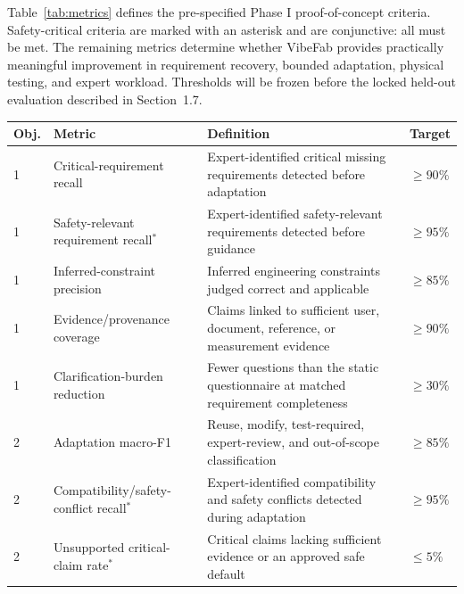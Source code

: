 \documentclass[11pt,letterpaper]{article}
\begin{document}
Table~\ref{tab:metrics} defines the pre-specified Phase I proof-of-concept criteria. Safety-critical criteria are marked with an asterisk and are conjunctive: all must be met. The remaining metrics determine whether VibeFab provides practically meaningful improvement in requirement recovery, bounded adaptation, physical testing, and expert workload. Thresholds will be frozen before the locked held-out evaluation described in Section~1.7.

\vspace{-3pt}
\begin{table}[H]
\centering
\scriptsize
\setlength{\tabcolsep}{3.5pt}
\begin{tabularx}{\textwidth}{
P{0.035\textwidth}
P{0.255\textwidth}
Y
P{0.05\textwidth}}
\toprule
\textbf{Obj.} &
\textbf{Metric} &
\textbf{Definition} &
\textbf{Target} \\
\midrule

1 &
Critical-requirement recall &
Expert-identified critical missing requirements detected before adaptation &
$\geq 90\%$ \\

1 &
Safety-relevant requirement recall$^{*}$ &
Expert-identified safety-relevant requirements detected before guidance &
$\geq 95\%$ \\

1 &
Inferred-constraint precision &
Inferred engineering constraints judged correct and applicable &
$\geq 85\%$ \\

1 &
Evidence/provenance coverage &
Claims linked to sufficient user, document, reference, or measurement evidence &
$\geq 90\%$ \\

1 &
Clarification-burden reduction &
Fewer questions than the static questionnaire at matched requirement completeness &
$\geq 30\%$ \\

\midrule

2 &
Adaptation macro-F1 &
Reuse, modify, test-required, expert-review, and out-of-scope classification &
$\geq 85\%$ \\

2 &
Compatibility/safety-conflict recall$^{*}$ &
Expert-identified compatibility and safety conflicts detected during adaptation &
$\geq 95\%$ \\

2 &
Unsupported critical-claim rate$^{*}$ &
Critical claims lacking sufficient evidence or an approved safe default &
$\leq 5\%$ \\


\end{tabularx}
\end{table}
\end{document}
